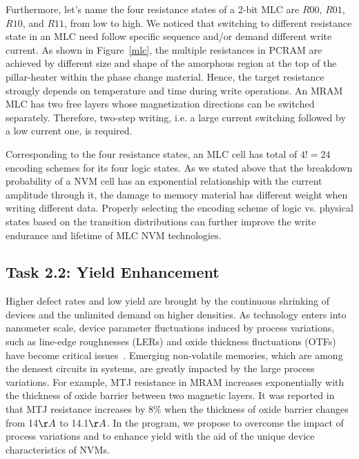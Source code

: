 Furthermore, let's name the four resistance states of a 2-bit MLC are $R00$, $R01$, $R10$, and $R11$, from low to high. We noticed that switching to different resistance state in an MLC need follow specific sequence and/or demand different write current. As shown in Figure~\ref{mlc}, the multiple resistances in PCRAM are achieved by different size and shape of the amorphous region at the top of the pillar-heater within the phase change material. Hence, the target resistance strongly depends on temperature and time during write operations. An MRAM MLC has two free layers whose magnetization directions can be switched separately. Therefore, two-step writing, i.e. a large current switching followed by a low current one, is required.

Corresponding to the four resistance states, an MLC cell has total of $4! = 24$ encoding schemes for its four logic states. As we stated above that the breakdown probability of a NVM cell has an exponential relationship with the current amplitude through it, the damage to memory material has different weight when writing different data. Properly selecting the encoding scheme of logic vs. physical states based on the transition distributions can further improve the write endurance and lifetime of MLC NVM technologies.

\subsection{Task 2.2: Yield Enhancement}
Higher defect rates and low yield are brought by the continuous shrinking of devices and the unlimited demand on higher densities. As technology enters into nanometer scale, device parameter fluctuations induced by process variations, such as line-edge roughnesses (LERs) and oxide thickness fluctuations (OTFs) have become critical issues~\cite{Asenov03}. Emerging non-volatile memories, which are among the densest circuits in systems, are greatly impacted by the large process variations. For example, MTJ resistance in MRAM increases exponentially with the thickness of oxide barrier between two magnetic layers. It was reported in~\cite{Tehrani00} that MTJ resistance increases by 8\% when the thickness of oxide barrier changes from 14${\AA}$ to 14.1${\AA}$. In the program, we propose to overcome the impact of process variations and to enhance yield with the aid of the unique device characteristics of NVMs.


